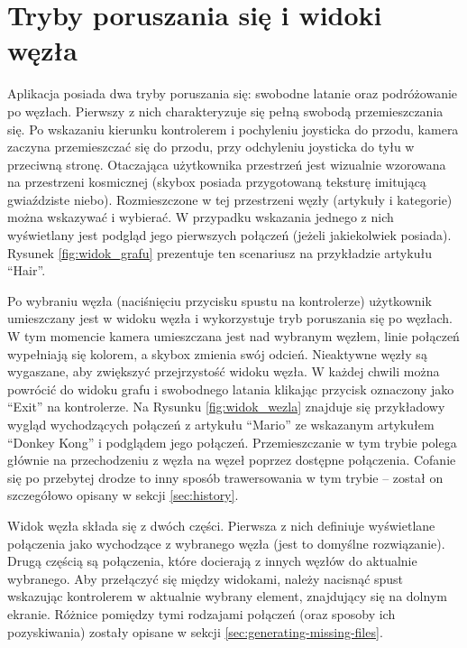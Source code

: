 \section{Tryby poruszania się i widoki węzła}
\label{sec:tryby-widoki}
Aplikacja posiada dwa tryby poruszania się: swobodne latanie oraz podróżowanie po węzłach. Pierwszy z nich charakteryzuje się pełną swobodą przemieszczania się. Po wskazaniu kierunku kontrolerem i pochyleniu joysticka do przodu, kamera zaczyna przemieszczać się do przodu, przy odchyleniu joysticka do tyłu w przeciwną stronę. Otaczająca użytkownika przestrzeń jest wizualnie wzorowana na przestrzeni kosmicznej (skybox posiada przygotowaną teksturę imitującą gwiaździste niebo). Rozmieszczone w tej przestrzeni węzły (artykuły i kategorie) można wskazywać i wybierać. W przypadku wskazania jednego z nich wyświetlany jest podgląd jego pierwszych połączeń (jeżeli jakiekolwiek posiada). Rysunek \ref{fig:widok_grafu} prezentuje ten scenariusz na przykładzie artykułu ``Hair''.


Po wybraniu węzła (naciśnięciu przycisku spustu na kontrolerze) użytkownik umieszczany jest w widoku węzła i wykorzystuje tryb poruszania się po węzłach. W tym momencie kamera umieszczana jest nad wybranym węzłem, linie połączeń wypełniają się kolorem, a skybox zmienia swój odcień. Nieaktywne węzły są wygaszane, aby zwiększyć przejrzystość widoku węzła. W każdej chwili można powrócić do widoku grafu i swobodnego latania klikając przycisk oznaczony jako ``Exit'' na kontrolerze. Na Rysunku \ref{fig:widok_wezla} znajduje się przykładowy wygląd wychodzących połączeń z artykułu ``Mario'' ze wskazanym artykułem ``Donkey Kong'' i podglądem jego połączeń. Przemieszczanie w tym trybie polega głównie na przechodzeniu z węzła na węzeł poprzez dostępne połączenia. Cofanie się po przebytej drodze to inny sposób trawersowania w tym trybie – został on szczegółowo opisany w sekcji \ref{sec:history}.


Widok węzła składa się z dwóch części. Pierwsza z nich definiuje wyświetlane połączenia jako wychodzące z wybranego węzła (jest to domyślne rozwiązanie). Drugą częścią są połączenia, które docierają z innych węzłów do aktualnie wybranego. Aby przełączyć się między widokami, należy nacisnąć spust wskazując kontrolerem w aktualnie wybrany element, znajdujący się na dolnym ekranie. Różnice pomiędzy tymi rodzajami połączeń (oraz sposoby ich pozyskiwania) zostały opisane w sekcji \ref{sec:generating-missing-files}.
